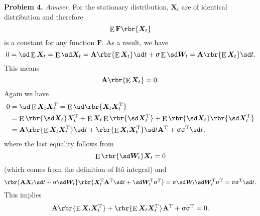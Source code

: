 \documentclass[english, nochinese]{pnote}
\DeclareMathOperator\ope{\mathrm{E}}
\begin{document}
\textbf{Problem 4.} \textit{Answer.} For the stationary distribution, $\bm{X}_t$ are of identical distribution and therefore
\begin{equation}
\ope \mathbf{F} \rbr{\bm{X}_t}
\end{equation}
is a constant for any function $\mathbf{F}$. As a result, we have
\begin{equation}
0 = \sd \ope \bm{X}_t = \ope \sd \bm{X}_t = \mathbf{A} \rbr{ \ope \bm{X}_t } \sd t + \upsigma \ope \sd \bm{W}_t = \mathbf{A} \rbr{ \ope \bm{X}_t } \sd t.
\end{equation}
This means
\begin{equation}
\mathbf{A} \rbr{ \ope \bm{X}_t } = 0.
\end{equation}
Again we have
\begin{equation}
\begin{split}
0 &= \sd \ope \bm{X}_t \bm{X}_t^{\text{T}} = \ope \sd \rbr{ \bm{X}_t \bm{X}_t^{\text{T}} } \\
    &= \ope \rbr{ \sd \bm{X}_t } \bm{X}_t^{\text{T}} + \ope \bm{X}_t \ope \rbr{ \sd \bm{X}_t^{\text{T}} } + \ope \rbr{ \sd \bm{X}_t } \rbr{ \sd \bm{X}_t^{\text{T}} } \\
&= \mathbf{A} \rbr{ \ope \bm{X}_t \bm{X}_t^{\text{T}} } \sd t + \rbr{ \ope \bm{X}_t \bm{X}_t^{\text{T}} } \sd t \mathbf{A}^{\text{T}} + \upsigma \upsigma^{\text{T}} \sd t,
\end{split}
\end{equation}
where the last equality follows from
\begin{equation}
\ope \rbr{ \sd \bm{W}_t } \bm{X}_t = 0
\end{equation}
(which comes from the definition of It\^o integral) and
\begin{equation}
\rbr{ \mathbf{A} \bm{X}_t \sd t + \upsigma \sd \bm{W}_t } \rbr{ \bm{X}_t^{\text{T}} \mathbf{A}^{\text{T}} \sd t + \sd \bm{W}_t^{\text{T}} \upsigma^{\text{T}} } = \upsigma \sd \bm{W}_t \sd \bm{W}_t^{\text{T}} \upsigma^{\text{T}} = \upsigma \upsigma^{\text{T}} \sd t.
\end{equation}
This implies
\begin{equation}
\mathbf{A} \rbr{ \ope \bm{X}_t \bm{X}_t^{\text{T}} } + \rbr{ \ope \bm{X}_t \bm{X}_t^{\text{T}} } \mathbf{A}^{\text{T}} + \upsigma \upsigma^{\text{T}} = 0.
\end{equation}
\end{document}
